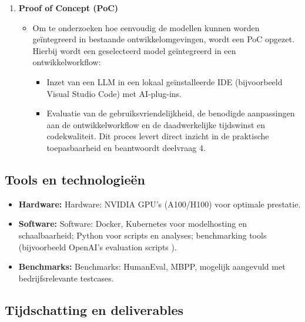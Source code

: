 \begin{enumerate}
    \item \textbf{Proof of Concept (PoC)}
    \begin{itemize}
        \item Om te onderzoeken hoe eenvoudig de modellen kunnen worden geïntegreerd in bestaande ontwikkelomgevingen, wordt een PoC opgezet. Hierbij wordt een geselecteerd model geïntegreerd in een ontwikkelworkflow:
        \begin{itemize}
            \item Inzet van een LLM in een lokaal geïnstalleerde IDE (bijvoorbeeld Visual Studio Code) met AI-plug-ins.
            \item Evaluatie van de gebruiksvriendelijkheid, de benodigde aanpassingen aan de ontwikkelworkflow en de daadwerkelijke tijdswinst en codekwaliteit.
            Dit proces levert direct inzicht in de praktische toepasbaarheid en beantwoordt deelvraag 4.
        \end{itemize}
    \end{itemize}
\end{enumerate}

\subsection{Tools en technologieën}

\begin{itemize}
    \item \textbf{Hardware:} Hardware: NVIDIA GPU’s (A100/H100) voor optimale prestatie.
    \item \textbf{Software:} Software: Docker, Kubernetes voor modelhosting en schaalbaarheid; Python voor scripts en analyses; benchmarking tools (bijvoorbeeld OpenAI’s evaluation scripts \autocite{Brown2020}).
    \item \textbf{Benchmarks:} Benchmarks: HumanEval, MBPP, mogelijk aangevuld met bedrijfsrelevante testcases.
\end{itemize}

\subsection{Tijdschatting en deliverables}

